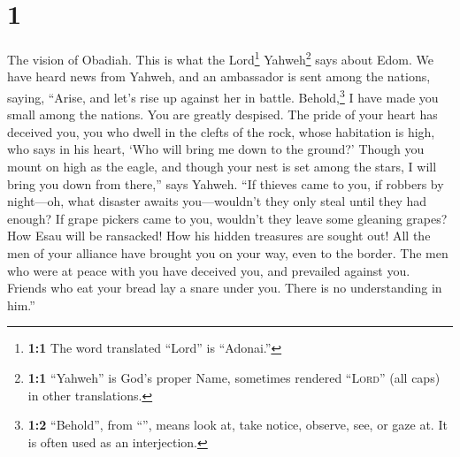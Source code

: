 \hypertarget{section}{%
\section{1}\label{section}}

 The vision of Obadiah. This is what the Lord\footnote{\textbf{1:1}
  The word translated ``Lord'' is ``Adonai.''} Yahweh\footnote{\textbf{1:1}
  ``Yahweh'' is God's proper Name, sometimes rendered ``\textsc{Lord}''
  (all caps) in other translations.} says about Edom. We have heard news
from Yahweh, and an ambassador is sent among the nations, saying,
``Arise, and let's rise up against her in battle. 
Behold,\footnote{\textbf{1:2} ``Behold'', from ``'', means
  look at, take notice, observe, see, or gaze at. It is often used as an
  interjection.} I have made you small among the nations. You are
greatly despised.  The pride of your heart has deceived
you, you who dwell in the clefts of the rock, whose habitation is high,
who says in his heart, `Who will bring me down to the ground?'
 Though you mount on high as the eagle, and though your
nest is set among the stars, I will bring you down from there,'' says
Yahweh.  ``If thieves came to you, if robbers by
night---oh, what disaster awaits you---wouldn't they only steal until
they had enough? If grape pickers came to you, wouldn't they leave some
gleaning grapes?  How Esau will be ransacked! How his
hidden treasures are sought out!  All the men of your
alliance have brought you on your way, even to the border. The men who
were at peace with you have deceived you, and prevailed against you.
Friends who eat your bread lay a snare under you. There is no
understanding in him.''

